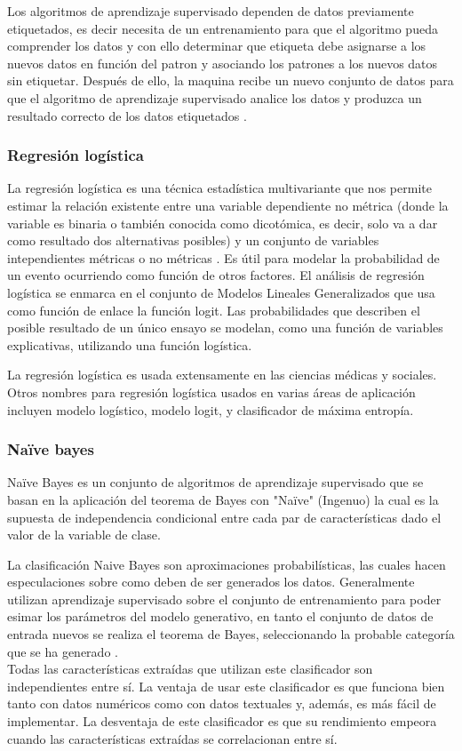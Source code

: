 Los algoritmos de aprendizaje supervisado dependen de datos previamente etiquetados, es decir necesita de un entrenamiento para 
que el algoritmo pueda comprender los datos y con ello determinar que etiqueta debe asignarse a los nuevos datos 
en función del patron y asociando los patrones a los nuevos datos sin etiquetar. Después de ello, la maquina recibe 
un nuevo conjunto de datos para que el algoritmo de aprendizaje supervisado analice los datos y produzca un resultado 
correcto de los datos etiquetados \citep{CT4}.



\subsubsection{Regresión logística}
La regresión logística es una técnica estadística multivariante que nos permite estimar la relación existente entre una variable dependiente 
no métrica (donde la variable es binaria o también conocida como dicotómica, es decir, solo va a dar como resultado dos alternativas posibles) 
y un conjunto de variables intependientes métricas o no métricas \citep{CT6}. Es útil para modelar la probabilidad de un evento ocurriendo como 
función de otros factores. El análisis de regresión logística se enmarca en el conjunto de Modelos Lineales Generalizados que usa como función de 
enlace la función logit. Las probabilidades que describen el posible resultado de un único ensayo se modelan, como una función de variables explicativas, 
utilizando una función logística.

La regresión logística es usada extensamente en las ciencias médicas y sociales. Otros nombres para regresión logística usados en varias áreas de 
aplicación incluyen modelo logístico, modelo logit, y clasificador de máxima entropía.


\subsubsection{Na{\"i}ve bayes}
Na{\"i}ve Bayes es un conjunto de algoritmos de aprendizaje supervisado que se basan en la aplicación del teorema de Bayes con "Na{\"i}ve" 
(Ingenuo) la cual es la supuesta de independencia condicional entre cada par de características dado el valor de la variable de clase. 

La clasificación Naive Bayes son aproximaciones probabilísticas, las cuales hacen especulaciones sobre como deben de ser 
generados los datos. Generalmente utilizan aprendizaje supervisado sobre el conjunto de entrenamiento para poder esimar los parámetros 
del modelo generativo, en tanto el conjunto de datos de entrada nuevos se realiza el teorema de Bayes, seleccionando la probable categoría 
que se ha generado \cite{CT7}.
\\
Todas las características extraídas que utilizan este clasificador son independientes entre sí. La ventaja de usar este clasificador es que 
funciona bien tanto con datos numéricos como con datos textuales y, además, es más fácil de implementar. La desventaja de este clasificador es 
que su rendimiento empeora cuando las características extraídas se correlacionan entre sí.

